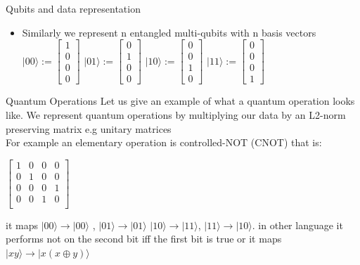     \begin{frame}{Qubits and data representation}
        \begin{itemize}
            \item Similarly we represent n \alert{entangled} multi-qubits with n basis vectors\\
            $|00\rangle := \begin{bmatrix}
                1\\
                0\\
                0\\
                0
            \end{bmatrix}$
            $|01\rangle := \begin{bmatrix}
                0\\
                1\\
                0\\
                0
            \end{bmatrix}$
            $|10\rangle := \begin{bmatrix}
                0\\
                0\\
                1\\
                0
            \end{bmatrix}$
            $|11\rangle := \begin{bmatrix}
                0\\
                0\\
                0\\
                1
            \end{bmatrix}$
        \end{itemize}
    \end{frame}

    \begin{frame}{Quantum Operations}
        Let us give an example of what a quantum operation looks like.
        We represent quantum operations by multiplying our data by an L2-norm preserving matrix e.g unitary matrices\\
        For example an elementary operation is controlled-NOT (CNOT) that is:\\
        \begin{center}
        $\begin{bmatrix}
            1&0&0&0\\
            0&1&0&0\\
            0&0&0&1\\
            0&0&1&0\\
        \end{bmatrix}$\\
    \end{center}
    it maps $|00\rangle \rightarrow |00\rangle$ , $|01\rangle \rightarrow |01\rangle$
    $|10\rangle \rightarrow |11\rangle$, $|11\rangle \rightarrow |10\rangle$. in other language
    it performs not on the second bit iff the first bit is true or it maps $|xy\rangle \rightarrow |x(x\oplus y)\rangle$

    \end{frame}
    
